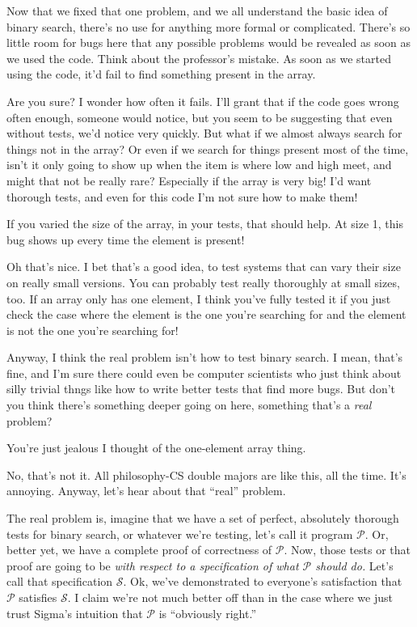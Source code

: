 \documentclass[sigplan]{acmart}
\begin{document}
  Now that we fixed that one problem, and
we all understand the basic idea of binary search, there's no use for
anything more formal or complicated.  There's so little room for bugs
here that any possible problems would be revealed as soon as we used
the code.  Think about the professor's mistake.  As soon as we started
using the code, it'd fail to find something present in the array.

 Are you sure?  I wonder how often it
fails.  I'll grant that if the code goes wrong often enough, someone
would notice, but you seem to be suggesting that even without tests,
we'd notice very quickly.  But what if we almost always search for
things not in the array?  Or even if we search for things present most
of the time, isn't it only going to show up when the item is where low
and high meet, and might that not be really rare?  Especially if the
array is very big!  I'd want thorough tests, and even for this code
I'm not sure how to make them!

 If you varied the size of the array, in
your tests, that should help.  At size 1, this bug shows up every time
the element is present!

  Oh that's nice.  I bet that's a good
idea, to test systems that can vary their size on really small
versions.  You can probably test really thoroughly at small sizes,
too.  If an array only has one element, I think you've fully tested it
if you just check the case where the element is the one you're
searching for and the element is not the one you're searching for!

  Anyway, I think the real problem isn't
how to test binary search.  I mean, that's fine, and I'm sure there
could even be computer scientists who just think about silly trivial
thngs like how to write better tests that find more bugs.  But don't
you think there's something deeper going on here, something that's a
\emph{real} problem?

  You're just jealous I thought of the
one-element array thing.

 No, that's not it.  All philosophy-CS
double majors are like this, all the time.  It's annoying. Anyway, let's hear about that ``real'' problem.

  The real problem is, imagine that we have
a set of perfect, absolutely thorough tests for binary search, or
whatever we're testing, let's call it program $\mathcal{P}$.  Or,
better yet, we have a complete proof of correctness of $\mathcal{P}$.
Now, those tests or that proof are going to be \emph{with respect to a
  specification of what $\mathcal{P}$ should do.}  Let's call that
specification $\mathcal{S}$.  Ok, we've demonstrated to everyone's
satisfaction that $\mathcal{P}$ satisfies $\mathcal{S}$.   I claim
we're not much better off than in the case where we just trust Sigma's
intuition that $\mathcal{P}$ is ``obviously right.''
\end{document}
